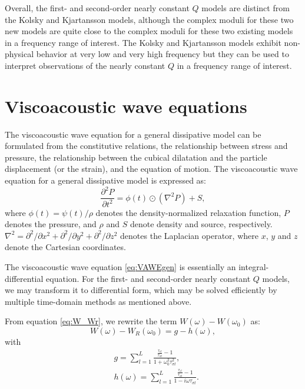 \documentclass[article]{./macros/elsarticle_qh}
\begin{document}
Overall, the first- and second-order nearly constant $Q$ models are distinct from the Kolsky and Kjartansson models, although the complex moduli for these two new models are quite close to the complex moduli for these two existing models in a frequency range of interest. 
The Kolsky and Kjartansson models exhibit non-physical behavior at very low and very high frequency but they can be used to interpret observations of the nearly constant $Q$ in a frequency range of interest.


\section{Viscoacoustic wave equations}
The viscoacoustic wave equation for a general dissipative model can be formulated from the constitutive relations, the relationship between stress and pressure, the relationship between the cubical dilatation and the particle displacement (or the strain), and the equation of motion. The viscoacoustic wave equation for a general dissipative model is expressed as:
\begin{equation} \label{eq:VAWEgen}
\frac{\partial^2 P}{\partial t^2} = \phi(t) \odot (\nabla^2 P) 
+ S,
\end{equation}
where $\phi(t)=\psi(t)/\rho$ denotes the density-normalized relaxation function, $P$ denotes the pressure, and $\rho$ and $S$ denote density and source, respectively. $\nabla^2 = \partial^2/\partial x^2 + \partial^2/\partial y^2 + \partial^2/\partial z^2$ denotes the Laplacian operator, where $x$, $y$ and $z$ denote the Cartesian coordinates. 

The viscoacoustic wave equation \ref{eq:VAWEgen} is essentially an integral-differential equation. For the first- and second-order nearly constant $Q$ models, we may transform it to differential form, which may be solved efficiently by multiple time-domain methods as mentioned above.

From equation \ref{eq:W_Wr}, we rewrite the term $W(\omega)-W(\omega_{0})$ as:
\begin{equation} \label{eq:WWr}
W(\omega) - W_{R}(\omega_{0}) = g - h(\omega)  ,
\end{equation}
with
\begin{align}
\label{eq:g}
& g = \sum_{l=1}^{L} 
\frac{\frac{\tau_{\epsilon l}}{\tau_{\sigma l}}-1}
{1+\omega_{0}^2\tau_{\sigma l}^2} , \\
\label{eq:h}
& h(\omega) = \sum_{l=1}^{L}
\frac{\frac{\tau_{\epsilon l}}{\tau_{\sigma l}}-1}
{1-i\omega\tau_{\sigma l}} .
\end{align}
\end{document}
